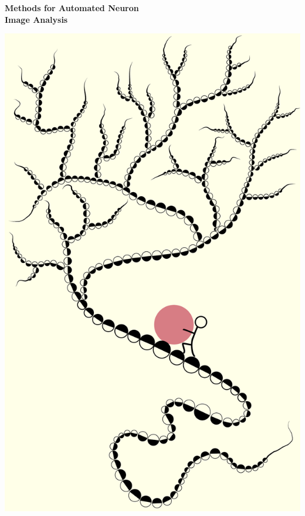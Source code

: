 %
%
\setlength{\parindent}{0pt}
\thispagestyle{empty}

\afterpage{\restorepagecolor} %

\vspace*{-3cm}
\begin{changemargin}{-1cm}{-1cm}

\begin{center}
	{\Huge\bf Methods for Automated Neuron \\[1ex] Image Analysis \\[2.2ex]}
\end{center}


\begin{center}
	\includegraphics[height=1.23\linewidth]{./cover/syziphus}
\end{center}


\end{changemargin}

